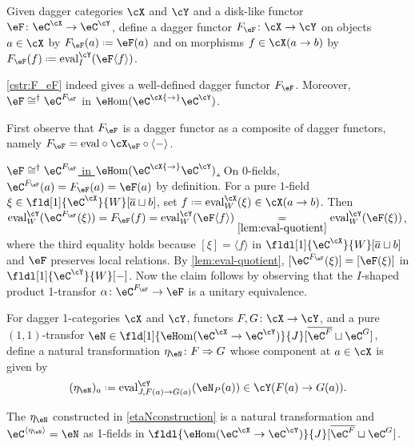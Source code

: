 \documentclass[12pt,reqno]{amsart}
\newcounter{alpha}\renewcommand\thealpha{\upshape\Alph{alpha}}
\newcommand{\eFun}{{\eH}\mathrm{om}}
\newcommand{\eval}{\mathrm{eval}}
\newcommand{\C}{\eC}
\newcommand{\fcj}[1]{\overline{#1}}
\newcommand{\itemstep}[1]{\smallskip\noindent\underline{#1}}
\renewcommand{\amalg}{\sqcup}
\renewcommand{\star}{\dag}
\DeclareRobustCommand{\coloneq}{\mathrel{\vcenter{\baselineskip0.5ex\lineskiplimit0pt\hbox{\scriptsize{\upshape.}}\hbox{\scriptsize{\upshape.}}}}=}
\begin{document}
\begin{construction}
  \label{cstr:F_eF}
  Given dagger categories $\cX$ and $\cY$ and a disk-like functor $\eF\colon\eC^\cX\to\eC^\cY$, define a dagger functor $F_\eF\colon\cX\to\cY$ on objects $a\in\cX$ by $F_\eF(a)\coloneq\eF(a)$ and on morphisms $f\in\cX(a\to b)$ by $F_\eF(f)\coloneq\eval_I^\cY(\eF\langle f\rangle)$.
\end{construction}

\begin{lemma}
\label{cstr:F_eF-pf}
\cref{cstr:F_eF} indeed gives a well-defined dagger functor $F_\eF$. Moreover, $\eF\cong^\star\eC^{F_\eF}$ in $\eFun(\eC^\cX{\to}\eC^\cY)$.
\end{lemma}

\begin{pf}
First observe that $F_\eF$ is a dagger functor as a composite of dagger functors, namely $F_\eF=\eval\circ\cX_\eF\circ\langle-\rangle$.

\itemstep{$\eF\cong^\star\eC^{F_\eF}$ in $\eFun(\eC^\cX{\to}\eC^\cY)$.}
On $0$-fields, $\eC^{F_\eF}(a)=F_\eF(a)=\eF(a)$ by definition. For a pure $1$-field $\xi\in\fld[1]{\eC^\cX}{W}[\fcj{a}\amalg b]$, set $f\coloneq\eval_W^\cX(\xi)\in\cX(a\to b)$. Then
\(
\eval_W^\cY(\eC^{F_\eF}(\xi))=F_\eF(f)=\eval_W^\cY(\eF\langle f\rangle)\underset{\eqref{lem:eval-quotient}}{=}\eval_W^\cY(\eF(\xi))
\),
where the third equality holds because $[\xi]=\langle f\rangle$ in $\fldl[1]{\eC^\cX}{W}[\fcj{a}\amalg b]$ and $\eF$ preserves local relations. By \cref{lem:eval-quotient}, $[\eC^{F_\eF}(\xi)]=[\eF(\xi)]$ in $\fldl[1]{\eC^\cY}{W}[-]$. Now the claim follows by observing that the $I$-shaped product 1-transfor $\alpha\colon \eC^{F_\eF}\to \eF$ is a unitary equivalence.
\end{pf}

\begin{construction} 
\label{etaNconstruction}
For dagger 1-categories $\cX$ and $\cY$, functors $F,G\colon\cX\to\cY$, and a pure $(1,1)$-transfor $\eN\in\fld[1]{\eFun(\eC^\cX\to\eC^\cY)}{J}[\fcj{\eC^F}\amalg\eC^G]$, define a natural transformation $\eta_\eN\colon F\Rightarrow G$ whose component at $a\in\cX$ is given by
\[
(\eta_\eN)_a\coloneq\eval^\cY_{J,F(a)\to G(a)}(\eN_P(a))\in\cY(F(a)\to G(a)).
\]
\end{construction}

\begin{lemma}
\label{etaNconstruction-pf}
The $\eta_\eN$ constructed in \cref{etaNconstruction} is a natural transformation and $\eC^{\langle\eta_\eN\rangle}=\eN$ as 1-fields in $\fldl{\eFun(\eC^\cX\to\eC^\cY)}{J}[\fcj{\C^F}\amalg \C^G]$.
\end{lemma}
\end{document}
